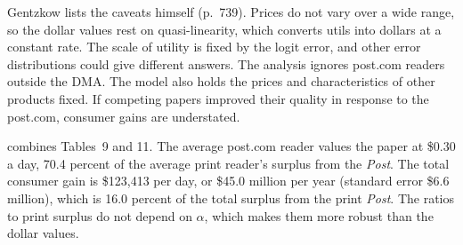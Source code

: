 Gentzkow lists the caveats himself (p.~739). Prices do not vary over a wide range, so the dollar values rest on
quasi-linearity, which converts utils into dollars at a constant rate. The scale of utility is fixed by the logit
error, and other error distributions could give different answers. The analysis ignores post.com readers outside the
DMA. The model also holds the prices and characteristics of other products fixed. If competing papers improved their
quality in response to the post.com, consumer gains are understated.

 combines Tables~9 and 11. The average post.com reader values the paper at \$0.30 a day,
70.4 percent of the average print reader's surplus from the \textit{Post}. The total consumer gain is \$123,413 per day,
or \$45.0 million per year (standard error \$6.6 million), which is 16.0 percent of the total surplus from the print
\textit{Post}. The ratios to print surplus do not depend on $\alpha$, which makes them more robust than the dollar
values.

